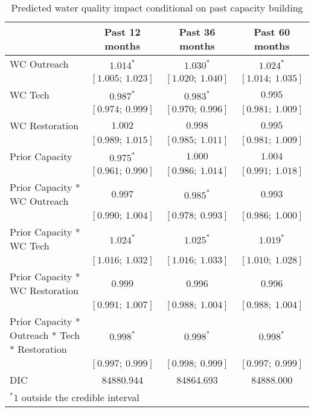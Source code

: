 
\begin{table}
\caption{Predicted water quality impact conditional on past capacity building}
\begin{center}
\begin{tabular}{l c c c }
\hline
                                               & Past 12 months & Past 36 months & Past 60 months \\
\hline
WC Outreach                                    & $1.014^{*}$       & $1.030^{*}$       & $1.024^{*}$       \\
                                               & $[1.005;\ 1.023]$ & $[1.020;\ 1.040]$ & $[1.014;\ 1.035]$ \\
WC Tech                                        & $0.987^{*}$       & $0.983^{*}$       & $0.995$           \\
                                               & $[0.974;\ 0.999]$ & $[0.970;\ 0.996]$ & $[0.981;\ 1.009]$ \\
WC Restoration                                 & $1.002$           & $0.998$           & $0.995$           \\
                                               & $[0.989;\ 1.015]$ & $[0.985;\ 1.011]$ & $[0.981;\ 1.009]$ \\
Prior Capacity                                 & $0.975^{*}$       & $1.000$           & $1.004$           \\
                                               & $[0.961;\ 0.990]$ & $[0.986;\ 1.014]$ & $[0.991;\ 1.018]$ \\
Prior Capacity * WC Outreach                   & $0.997$           & $0.985^{*}$       & $0.993$           \\
                                               & $[0.990;\ 1.004]$ & $[0.978;\ 0.993]$ & $[0.986;\ 1.000]$ \\
Prior Capacity * WC Tech                       & $1.024^{*}$       & $1.025^{*}$       & $1.019^{*}$       \\
                                               & $[1.016;\ 1.032]$ & $[1.016;\ 1.033]$ & $[1.010;\ 1.028]$ \\
Prior Capacity * WC Restoration                & $0.999$           & $0.996$           & $0.996$           \\
                                               & $[0.991;\ 1.007]$ & $[0.988;\ 1.004]$ & $[0.988;\ 1.004]$ \\
Prior Capacity * Outreach * Tech * Restoration & $0.998^{*}$       & $0.998^{*}$       & $0.998^{*}$       \\
                                               & $[0.997;\ 0.999]$ & $[0.998;\ 0.999]$ & $[0.997;\ 0.999]$ \\
\hline
DIC                                            & 84880.944         & 84864.693         & 84888.000         \\
\hline
\multicolumn{4}{l}{\scriptsize{$^* 1$ outside the credible interval}}
\end{tabular}
\label{table:capacityfunding}
\end{center}
\end{table}
